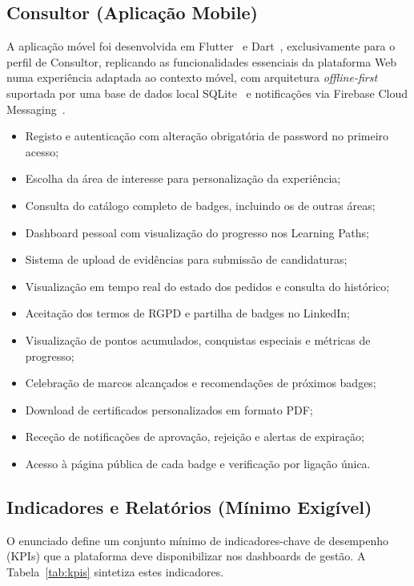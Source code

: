 \documentclass[12pt,a4paper]{report}
\begin{document}
\subsection{Consultor (Aplicação Mobile)}

A aplicação móvel foi desenvolvida em Flutter~\cite{flutter} e Dart~\cite{dart}, exclusivamente para o perfil de Consultor, replicando as funcionalidades essenciais da plataforma Web numa experiência adaptada ao contexto móvel, com arquitetura \textit{offline-first} suportada por uma base de dados local SQLite~\cite{sqflite} e notificações via Firebase Cloud Messaging~\cite{firebase}.

\begin{itemize}
  \item Registo e autenticação com alteração obrigatória de password no primeiro acesso;
  \item Escolha da área de interesse para personalização da experiência;
  \item Consulta do catálogo completo de badges, incluindo os de outras áreas;
  \item Dashboard pessoal com visualização do progresso nos Learning Paths;
  \item Sistema de upload de evidências para submissão de candidaturas;
  \item Visualização em tempo real do estado dos pedidos e consulta do histórico;
  \item Aceitação dos termos de RGPD e partilha de badges no LinkedIn;
  \item Visualização de pontos acumulados, conquistas especiais e métricas de progresso;
  \item Celebração de marcos alcançados e recomendações de próximos badges;
  \item Download de certificados personalizados em formato PDF;
  \item Receção de notificações de aprovação, rejeição e alertas de expiração;
  \item Acesso à página pública de cada badge e verificação por ligação única.
\end{itemize}

\subsection{Indicadores e Relatórios (Mínimo Exigível)}

O enunciado define um conjunto mínimo de indicadores-chave de desempenho (KPIs) que a plataforma deve disponibilizar nos dashboards de gestão. A Tabela~\ref{tab:kpis} sintetiza estes indicadores.
\end{document}
